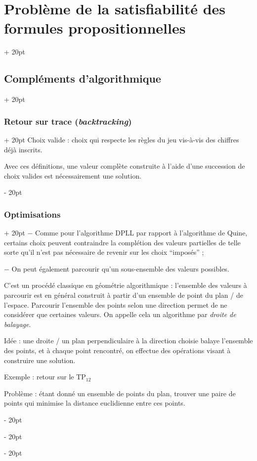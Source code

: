 \documentclass[a4paper, 12pt, twoside]{article}
\newcommand{\ind}[1][20pt]{\advance\leftskip + #1}
\newcommand{\deind}[1][20pt]{\advance\leftskip - #1}
\newenvironment{indt}[2][20pt]{#2 \par \ind[#1]}{\par \deind} %
\begin{document}
\begin{indt}{\section{Problème de la satisfiabilité des formules propositionnelles}}
\begin{indt}{\subsection{Compléments d'algorithmique}}
\begin{indt}{\subsubsection{Retour sur trace (\textit{backtracking})}}
                Choix valide : choix qui respecte les règles du jeu vis-à-vis des chiffres déjà inscrits.
                
                \vspace{12pt}
                
                Avec ces définitions, une valeur complète construite à l'aide d'une succession de choix valides est nécessairement une solution.
            \end{indt}
            
            \vspace{12pt}
            
            \begin{indt}{\subsubsection{Optimisations}}
                $-$ Comme pour l'algorithme DPLL par rapport à l'algorithme de Quine, certains choix peuvent contraindre la complétion des valeurs partielles de telle sorte qu'il n'est pas nécessaire de revenir sur les choix ``imposés'' ;
                
                \vspace{12pt}
                
                $-$ On peut également parcourir qu'un sous-ensemble des valeurs possibles.
                
                C'est un procédé classique en géométrie algorithmique : l'ensemble des valeurs à parcourir est en général construit à partir d'un ensemble de point du plan / de l'espace. Parcourir l'ensemble des points selon une direction permet de ne considérer que certaines valeurs. On appelle cela un algorithme par \textit{droite de balayage}.
                
                \vspace{12pt}
                
                Idée : une droite / un plan perpendiculaire à la direction choisie balaye l'ensemble des points, et à chaque point rencontré, on effectue des opérations visant à construire une solution.
                
                Exemple : retour sur le TP$_{12}$
                
                Problème : étant donné un ensemble de points du plan, trouver une paire de points qui minimise la distance euclidienne entre ces points.
                

\end{indt}
\end{indt}
\end{indt}
\end{document}
